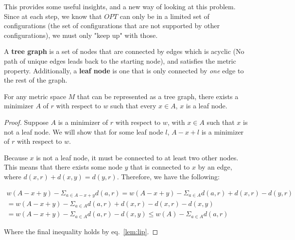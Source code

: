 This provides some useful insights, and a new way of looking at this problem. Since at each step, we know that $OPT$ can only be in a limited set of configurations (the set of configurations that are not supported by other configurations), we must only "keep up" with those.

\begin{definition}
    A \textbf{tree graph} is a set of nodes that are connected by edges which is acyclic (No path of unique edges leads back to the starting node), and satisfies the metric property. Additionally, a \textbf{leaf node} is one that is only connected by \textit{one} edge to the rest of the graph.
\end{definition}

\begin{lemma}
    For any metric space $M$ that can be represented as a tree graph, there exists a minimizer $A$ of $r$ with respect to $w$ such that every $x \in A$, $x$ is a leaf node.
\end{lemma}

\begin{proof}
    Suppose $A$ is a minimizer of $r$ with respect to $w$, with $x \in A$ such that $x$ is not a leaf node. We will show that for some leaf node $l$, $A-x+l$ is a minimizer of $r$ with respect to $w$. 

    Because $x$ is not a leaf node, it must be connected to at least two other nodes. This means that there exists some node $y$ that is connected to $x$ by an edge, where $d(x,r) + d(x,y) = d(y,r)$. Therefore, we have the following:

    \begin{equation*}
        \begin{gathered}
            w(A-x+y) - \Sigma_{a \in A-x+y} d(a,r) = w(A-x+y) - \Sigma_{a \in A} d(a,r) + d(x,r) - d(y,r) \\
            = w(A-x+y) - \Sigma_{a \in A} d(a,r) + d(x,r) - d(x,r) - d(x,y)\\
            = w(A-x+y) - \Sigma_{a \in A} d(a,r) - d(x,y) \leq w(A) - \Sigma_{a \in A} d(a,r)
        \end{gathered}
    \end{equation*}

    Where the final inequality holds by eq.~\ref{lem:lip}.
\end{proof}



